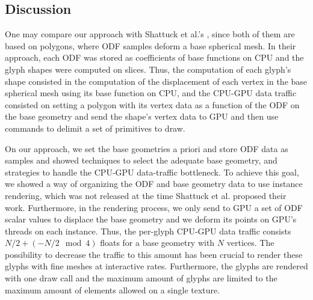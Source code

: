\documentclass[twoside,twocolumn,10pt]{article}
\begin{document}
\subsection{Discussion}

One may compare our approach with Shattuck et al.'s \cite{shattuck2008}, since both of them are based on polygons, where ODF samples deform a base spherical mesh. In their approach, each ODF was stored as coefficients of base functions on CPU and the glyph shapes were computed on slices. Thus, the computation of each glyph's shape consisted in the computation of the displacement of each vertex in the base spherical mesh using its base function on CPU, and the CPU-GPU data traffic consisted on setting a polygon with its vertex data as a function of the ODF on the base geometry and send the shape's vertex data to GPU and then use commands to delimit a set of primitives to draw.

On our approach, we set the base geometries a priori and store ODF data as samples and showed techniques to select the adequate base geometry, and strategies to handle the CPU-GPU data-traffic bottleneck. To achieve this goal, we showed a way of organizing the ODF and base geometry data to use instance rendering, which was not released at the time Shattuck et al. proposed their work. Furthermore, in the rendering process, we only send to GPU a set of ODF scalar values to displace the base geometry and we deform its points on GPU's threads on each instance. Thus, the per-glyph CPU-GPU data traffic consists $N/2 + (-N/2 \mod{4})$ floats for a base geometry with $N$ vertices. The possibility to decrease the traffic to this amount has been crucial to render these glyphs with fine meshes at interactive rates. Furthermore, the glyphs are rendered with one draw call and the maximum amount of glyphs are limited to the maximum amount of elements allowed on a single texture.

\end{document}
